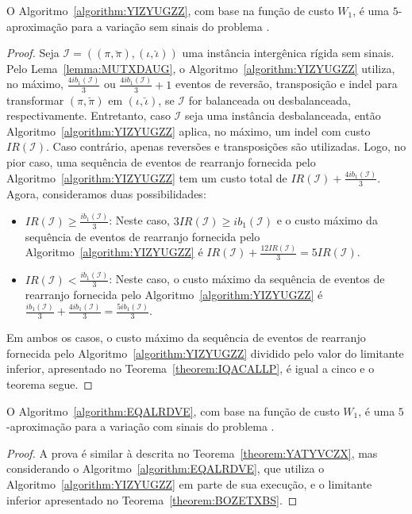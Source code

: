 \begin{theorem}\label{theorem:YATYVCZX}
O Algoritmo~\ref{algorithm:YIZYUGZZ}, com base na função de custo $W_1$, é uma $5$-aproximação para a variação sem sinais do problema \SbWIRTI{}.
\end{theorem}
\begin{proof}
Seja $\mathcal{I} = ((\pi,\breve\pi),(\iota,\breve\iota))$ uma instância intergênica rígida sem sinais. Pelo Lema~\ref{lemma:MUTXDAUG}, o Algoritmo~\ref{algorithm:YIZYUGZZ} utiliza, no máximo, $\frac{4ib_1(\mathcal{I})}{3}$ ou $\frac{4ib_1(\mathcal{I})}{3} + 1$ eventos de reversão, transposição e indel para transformar $(\pi,\breve\pi)$ em $(\iota,\breve\iota)$, se $\mathcal{I}$ for balanceada ou desbalanceada, respectivamente. Entretanto, caso $\mathcal{I}$ seja uma instância desbalanceada, então Algoritmo~\ref{algorithm:YIZYUGZZ} aplica, no máximo, um indel com custo $IR(\mathcal{I})$. Caso contrário, apenas reversões e transposições são utilizadas. Logo, no pior caso, uma sequência de eventos de rearranjo fornecida pelo Algoritmo~\ref{algorithm:YIZYUGZZ} tem um custo total de $IR(\mathcal{I}) + \frac{4ib_1(\mathcal{I})}{3}$. Agora, consideramos duas possibilidades:
\begin{itemize}
  \item $IR(\mathcal{I}) \ge \frac{ib_1(\mathcal{I})}{3}$: Neste caso, $3IR(\mathcal{I}) \ge ib_1(\mathcal{I})$ e o custo máximo da sequência de eventos de rearranjo fornecida pelo Algoritmo~\ref{algorithm:YIZYUGZZ} é $IR(\mathcal{I}) + \frac{12IR(\mathcal{I})}{3} = 5IR(\mathcal{I})$.
  \item $IR(\mathcal{I}) < \frac{ib_1(\mathcal{I})}{3}$: Neste caso, o custo máximo da sequência de eventos de rearranjo fornecida pelo Algoritmo~\ref{algorithm:YIZYUGZZ} é $\frac{ib_1(\mathcal{I})}{3} + \frac{4ib_1(\mathcal{I})}{3} = \frac{5ib_1(\mathcal{I})}{3}$.
\end{itemize}
Em ambos os casos, o custo máximo da sequência de eventos de rearranjo fornecida pelo Algoritmo~\ref{algorithm:YIZYUGZZ} dividido pelo valor do limitante inferior, apresentado no Teorema~\ref{theorem:IQACALLP}, é igual a cinco e o teorema segue.
\end{proof}

\begin{theorem}\label{theorem:XMRIBCHD}
O Algoritmo~\ref{algorithm:EQALRDVE}, com base na função de custo $W_1$, é uma $5$-aproximação para a variação com sinais do problema \SbWIRI{}.
\end{theorem}
\begin{proof}
A prova é similar à descrita no Teorema~\ref{theorem:YATYVCZX}, mas considerando o Algoritmo~\ref{algorithm:EQALRDVE}, que utiliza o Algoritmo~\ref{algorithm:YIZYUGZZ} em parte de sua execução, e o limitante inferior apresentado no Teorema~\ref{theorem:BOZETXBS}.
\end{proof}

